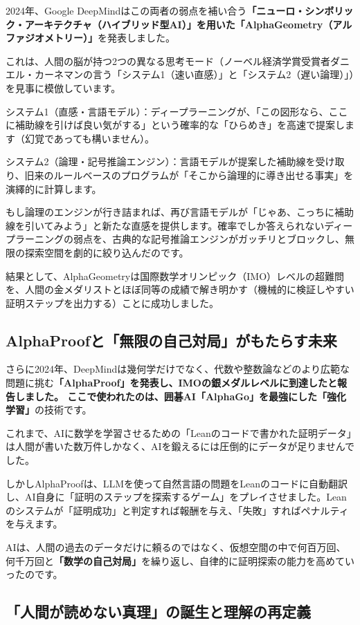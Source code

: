 2024年、Google DeepMindはこの両者の弱点を補い合う\textbf{「ニューロ・シンボリック・アーキテクチャ（ハイブリッド型AI）」を用いた「AlphaGeometry（アルファジオメトリー）」}を発表しました。

これは、人間の脳が持つ2つの異なる思考モード（ノーベル経済学賞受賞者ダニエル・カーネマンの言う「システム1（速い直感）」と「システム2（遅い論理）」）を見事に模倣しています。

システム1（直感・言語モデル）：ディープラーニングが、「この図形なら、ここに補助線を引けば良い気がする」という確率的な「ひらめき」を高速で提案します（幻覚であっても構いません）。

システム2（論理・記号推論エンジン）：言語モデルが提案した補助線を受け取り、旧来のルールベースのプログラムが「そこから論理的に導き出せる事実」を演繹的に計算します。

もし論理のエンジンが行き詰まれば、再び言語モデルが「じゃあ、こっちに補助線を引いてみよう」と新たな直感を提供します。確率でしか答えられないディープラーニングの弱点を、古典的な記号推論エンジンがガッチリとブロックし、無限の探索空間を劇的に絞り込んだのです。

結果として、AlphaGeometryは国際数学オリンピック（IMO）レベルの超難問を、人間の金メダリストとほぼ同等の成績で解き明かす（機械的に検証しやすい証明ステップを出力する）ことに成功しました。

\subsection{AlphaProofと「無限の自己対局」がもたらす未来}

さらに2024年、DeepMindは幾何学だけでなく、代数や整数論などのより広範な問題に挑む\textbf{「AlphaProof」を発表し、IMOの銀メダルレベルに到達したと報告しました。 ここで使われたのは、囲碁AI「AlphaGo」を最強にした「強化学習」}の技術です。

これまで、AIに数学を学習させるための「Leanのコードで書かれた証明データ」は人間が書いた数万件しかなく、AIを鍛えるには圧倒的にデータが足りませんでした。

しかしAlphaProofは、LLMを使って自然言語の問題をLeanのコードに自動翻訳し、AI自身に「証明のステップを探索するゲーム」をプレイさせました。Leanのシステムが「証明成功」と判定すれば報酬を与え、「失敗」すればペナルティを与えます。

AIは、人間の過去のデータだけに頼るのではなく、仮想空間の中で何百万回、何千万回と\textbf{「数学の自己対局」}を繰り返し、自律的に証明探索の能力を高めていったのです。

\subsection{「人間が読めない真理」の誕生と理解の再定義}

